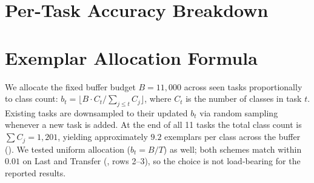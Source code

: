 \documentclass{article}
\begin{document}
  \section{Per-Task Accuracy Breakdown}
  \label{app:pertask}
 \begin{table}[h]
  \centering
  \caption{Per-dataset final accuracy (\%) for ExRD after training all 11 tasks.
  Order~I figures are from the primary seed (seed~42; Last$\,{=}\,86.17$); the          
  three-seed mean is $86.28\!\pm\!0.10$. Order~II is single-seed.                       
  \textbf{IN} = final ImageNet accuracy (cf.\ Transfer, which is the mean of            
  ImageNet accuracy measured before each task).                                         
  AC = Aircraft, Cal = Caltech-101, C100 = CIFAR-100, ES = EuroSAT,                     
  Fl = Flowers-102, Fo = Food-101, MN = MNIST, Pet = Oxford-IIIT Pet,                   
  Cars = StanfordCars.}                                                                 
  \label{tab:pertask}
  \end{table}
   \section{Exemplar Allocation Formula}
  \label{app:allocation}

  We allocate the fixed buffer budget $B{=}11{,}000$ across seen tasks
  proportionally to class count: $b_t = \lfloor B \cdot C_t / \sum_{j \le t} C_j
  \rfloor$, where $C_t$ is the number of classes in task $t$. Existing tasks are
  downsampled to their updated $b_t$ via random sampling whenever a new task is
  added. At the end of all 11 tasks the total class count is $\sum C_j = 1{,}201$,
  yielding approximately $9.2$ exemplars per class across the buffer
  (). We tested uniform allocation ($b_t = B/T$) as well;
  both schemes match within $0.01$ on Last and Transfer (,
  rows 2--3), so the choice is not load-bearing for the reported results.
\end{document}
